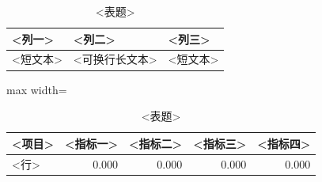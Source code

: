 
\begin{table}[H]
  \centering
  \caption{<表题>}
  \label{tab:<label>}
  \small
  \begin{tabularx}{\textwidth}{p{} X p{}}
    \toprule
    <列一> & <列二> & <列三> \\
    \midrule
    <短文本> & <可换行长文本> & <短文本> \\
    \bottomrule
  \end{tabularx}
\end{table}

\begin{table}[H]
  \centering
  \caption{<表题>}
  \label{tab:<label>}
  \begin{adjustbox}{max width=\textwidth}
  \begin{tabular}{lrrrr}
    \toprule
    <项目> & <指标一> & <指标二> & <指标三> & <指标四> \\
    \midrule
    <行> & 0.000 & 0.000 & 0.000 & 0.000 \\
    \bottomrule
  \end{tabular}
  \end{adjustbox}
\end{table}

